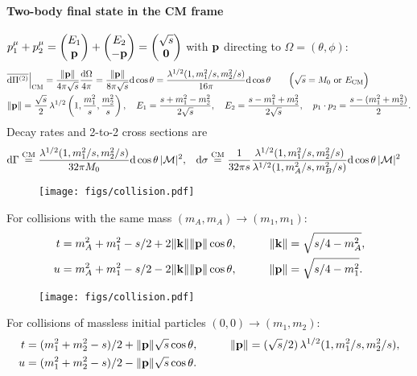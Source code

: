 \documentclass[CheatSheet]{subfiles}
\begin{document}
\paragraph{Two-body final state in the CM frame}
$\displaystyle p_1^\mu+p_2^\mu=\begin{pmatrix}E_1\\{\mathbf{p}}\end{pmatrix}+\begin{pmatrix}E_2\\-{\mathbf{p}}\end{pmatrix}=\begin{pmatrix}\sqrt s\\{\mathbf{0}}\end{pmatrix}$
with ${\mathbf{p}}$ directing to $\Omega=(\theta,\phi)$:
\begin{align}
&\overline{\dd\Pi^{(2)}}\Big|\w{CM}
=\frac{\|\vc p\|}{4\pi\sqrt{s}}\frac{\dd\Omega}{4\pi}
=
\frac{\|\vc p\|}{8\pi \sqrt{s}}\dd\cos\theta
=
\frac{\Kallen[1/2](1,m_1^2/s,m_2^2/s)}{16\pi}\dd\cos\theta
\qquad \Bigl(\text{$\sqrt s = M_0$ or $E\w{CM}$}\Bigr)
\\
\notag&
\|\vc p\|=\frac{\sqrt{s}}{2}\Kallen[1/2]\left(1,\frac{m_1^2}{s},\frac{m_2^2}{s}\right),\quad
 E_1=\frac{s+m_1^2-m_2^2}{2\sqrt{s}},\quad
 E_2=\frac{s-m_1^2+m_2^2}{2\sqrt{s}},\quad
 p_1\cdot p_2 = \frac{s-(m_1^2+m_2^2)}{2}.
\end{align}
Decay rates and 2-to-2 cross sections are
\begin{align}
\dd\Gamma
&\stackrel{\text{CM}}{=}
\frac{\Kallen[1/2](1,m_1^2/s,m_2^2/s)}{32\pi M_0}
  \dd\cos\theta\,|\mathcal M|^2,
&
\dd\sigma
&\stackrel{\text{CM}}{=}
\frac{1}{32\pi s}
  \frac{\Kallen[1/2](1,m_1^2/s,m_2^2/s)}{\Kallen[1/2](1,m_A^2/s,m_B^2/s)}
  \dd\cos\theta\,|\mathcal M|^2
\end{align}


\begin{wrapfigure}[2]{r}{12em}\vspace{-1.5em}
 \texttt{[image: figs/collision.pdf]}
\end{wrapfigure}

\noindent
For collisions with the same mass $(m_A,m_A)\to (m_1,m_1)$:
\begin{alignat*}{2}
t &= m_A^2+m_1^2 - s/2+2\|{\mathbf{k}}\|\|{\mathbf{p}}\|\cos\theta,\qquad
&\|{\mathbf{k}}\|&={\sqrt{s/4-m_A^2}},\\
u &= m_A^2+m_1^2 - s/2-2\|{\mathbf{k}}\|\|{\mathbf{p}}\|\cos\theta,
&\|{\mathbf{p}}\|&={\sqrt{s/4-m_1^2}}.
\end{alignat*}

\begin{wrapfigure}[2]{r}{12em}\vspace{-2em}
 \texttt{[image: figs/collision.pdf]}
\end{wrapfigure}

\noindent
For collisions of massless initial particles $(0,0)\to (m_1,m_2)$:
\begin{alignat*}{2}
 t &= (m_1^2+m_2^2-s)/2+\|\vc p\|\sqrt{s}\cos\theta,\qquad
&\|\vc p\|&=(\sqrt{s}/2)\Kallen[1/2](1,m_1^2/s,m_2^2/s),\\
 u &= (m_1^2+m_2^2-s)/2-\|\vc p\|\sqrt{s}\cos\theta.
\end{alignat*}
\end{document}
